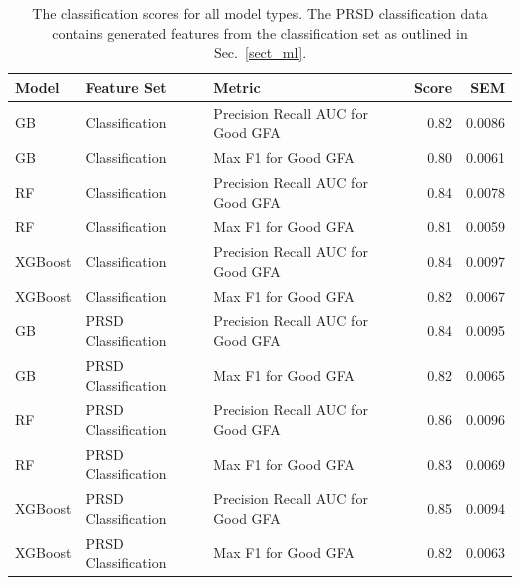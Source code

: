 \documentclass[11pt,a4paper]{article}                                %
\begin{document}
\begin{table}[H]
\centering
\caption{The classification scores for all model types. The PRSD classification data contains generated features from the classification set as outlined in Sec.~\ref{sect_ml}.}
\begin{tabular}{|lllrr|}
\hline
{Model} & {Feature Set} & {Metric}                   & {Score} & {SEM} \\ \hline
\hline
GB                  & Classification       & Precision Recall AUC for Good GFA & 0.82           & 0.0086                \\ \hline
GB                  & Classification       & Max F1 for Good GFA               & 0.80           & 0.0061                \\ \hline
RF                  & Classification       & Precision Recall AUC for Good GFA & 0.84           & 0.0078                \\ \hline
RF                  & Classification       & Max F1 for Good GFA               & 0.81           & 0.0059                \\ \hline
XGBoost             & Classification       & Precision Recall AUC for Good GFA & 0.84           & 0.0097                \\ \hline
XGBoost             & Classification       & Max F1 for Good GFA               & 0.82           & 0.0067                \\ \hline
GB                  & PRSD Classification  & Precision Recall AUC for Good GFA & 0.84           & 0.0095                \\ \hline
GB                  & PRSD Classification  & Max F1 for Good GFA               & 0.82           & 0.0065                \\ \hline
RF                  & PRSD Classification  & Precision Recall AUC for Good GFA & 0.86           & 0.0096                \\ \hline
RF                  & PRSD Classification  & Max F1 for Good GFA               & 0.83           & 0.0069                \\ \hline
XGBoost             & PRSD Classification  & Precision Recall AUC for Good GFA & 0.85           & 0.0094                \\ \hline
XGBoost             & PRSD Classification  & Max F1 for Good GFA               & 0.82           & 0.0063                \\ \hline
\end{tabular}
\label{ml_scores}
\end{table}
\end{document}
